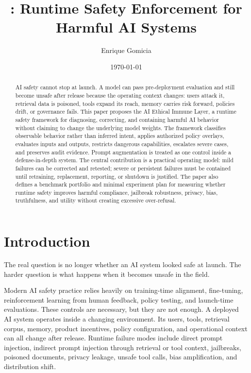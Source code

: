 \documentclass[11pt]{article}
\title{\textbf{\AEIL: Runtime Safety Enforcement for Harmful AI Systems}}
\author{Enrique Gomicia}
\date{\today}
\newcommand{\AEIL}{AI Ethical Immune Layer}
\begin{document}
\maketitle

\begin{abstract}
AI safety cannot stop at launch. A model can pass pre-deployment evaluation and still become unsafe after release because the operating context changes: users attack it, retrieval data is poisoned, tools expand its reach, memory carries risk forward, policies drift, or governance fails. This paper proposes the \AEIL, a runtime safety framework for diagnosing, correcting, and containing harmful AI behavior without claiming to change the underlying model weights. The framework classifies observable behavior rather than inferred intent, applies authorized policy overlays, evaluates inputs and outputs, restricts dangerous capabilities, escalates severe cases, and preserves audit evidence. Prompt augmentation is treated as one control inside a defense-in-depth system. The central contribution is a practical operating model: mild failures can be corrected and retested; severe or persistent failures must be contained until retraining, replacement, reporting, or shutdown is justified. The paper also defines a benchmark portfolio and minimal experiment plan for measuring whether runtime safety improves harmful compliance, jailbreak robustness, privacy, bias, truthfulness, and utility without creating excessive over-refusal.
\end{abstract}

\section{Introduction}

The real question is no longer whether an AI system looked safe at launch. The harder question is what happens when it becomes unsafe in the field.

Modern AI safety practice relies heavily on training-time alignment, fine-tuning, reinforcement learning from human feedback, policy testing, and launch-time evaluations. These controls are necessary, but they are not enough. A deployed AI system operates inside a changing environment. Its users, tools, retrieval corpus, memory, product incentives, policy configuration, and operational context can all change after release. Runtime failure modes include direct prompt injection, indirect prompt injection through retrieval or tool context, jailbreaks, poisoned documents, privacy leakage, unsafe tool calls, bias amplification, and distribution shift.
\end{document}
